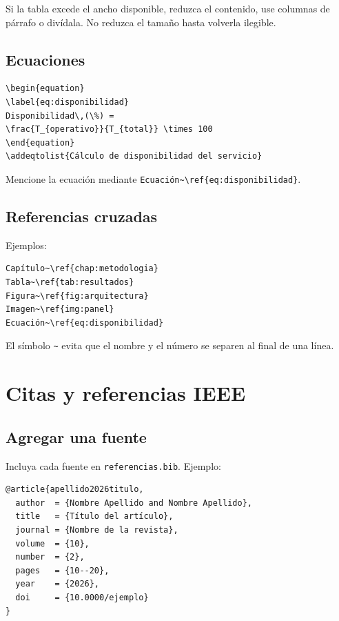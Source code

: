 \documentclass[12pt,a4paper,oneside]{report}
\begin{document}
Si la tabla excede el ancho disponible, reduzca el contenido, use columnas de párrafo o divídala. No reduzca el tamaño hasta volverla ilegible.

\section{Ecuaciones}

\begin{lstlisting}
\begin{equation}
\label{eq:disponibilidad}
Disponibilidad\,(\%) =
\frac{T_{operativo}}{T_{total}} \times 100
\end{equation}
\addeqtolist{Cálculo de disponibilidad del servicio}
\end{lstlisting}

Mencione la ecuación mediante \texttt{Ecuación\textasciitilde\textbackslash ref\{eq:disponibilidad\}}.

\section{Referencias cruzadas}

Ejemplos:

\begin{lstlisting}
Capítulo~\ref{chap:metodologia}
Tabla~\ref{tab:resultados}
Figura~\ref{fig:arquitectura}
Imagen~\ref{img:panel}
Ecuación~\ref{eq:disponibilidad}
\end{lstlisting}

El símbolo \texttt{\textasciitilde} evita que el nombre y el número se separen al final de una línea.

\chapter{Citas y referencias IEEE}

\section{Agregar una fuente}

Incluya cada fuente en \texttt{referencias.bib}. Ejemplo:

\begin{lstlisting}
@article{apellido2026titulo,
  author  = {Nombre Apellido and Nombre Apellido},
  title   = {Título del artículo},
  journal = {Nombre de la revista},
  volume  = {10},
  number  = {2},
  pages   = {10--20},
  year    = {2026},
  doi     = {10.0000/ejemplo}
}
\end{lstlisting}
\end{document}
